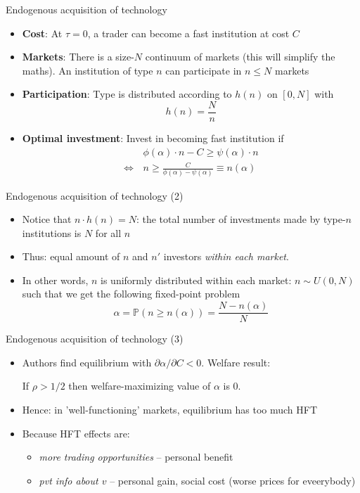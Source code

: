\documentclass[english,10pt
,aspectratio=169
]{beamer}
\begin{document}
\begin{frame}{Endogenous acquisition of technology}
	\begin{itemize}
		\item \textbf{Cost}: At $\tau=0$, a trader can become a fast institution at cost $C$
		\item \textbf{Markets}: There is a size-$N$ continuum of markets (this will simplify the maths). An institution of type $n$ can participate in $n \leq N$ markets
		\item \textbf{Participation}: Type is distributed according to $h(n)$ on $[0, N]$ with
		\[
		h(n) = \frac{N}{n}
		\]
		\item \textbf{Optimal investment}: Invest in becoming fast institution if
		\begin{align*}
		& \phi(\alpha) \cdot n - C \geq \psi(\alpha) \cdot n  \\
		\Leftrightarrow \, & n \geq \frac{C}{\phi(\alpha)-\psi(\alpha)} \equiv n(\alpha)
		\end{align*}
	\end{itemize}
\end{frame}


\begin{frame}{Endogenous acquisition of technology (2)}
	\begin{itemize}
		\item Notice that $n \cdot h(n)=N$: the total number of investments made by type-$n$ institutions is $N$ for all $n$
		\item Thus: equal amount of $n$ and $n'$ investors \textit{within each market}.
		\item In other words, $n$ is uniformly distributed within each market: $n \sim U(0,N)$ such that  we get the following fixed-point problem
		\[
		\alpha = \mathbb{P}(n \ge n(\alpha))=\frac{N-n(\alpha)}{N}
		\]
	\end{itemize}
\end{frame}


\begin{frame}{Endogenous acquisition of technology (3)}
	\begin{itemize}
		\item Authors find equilibrium with $\partial \alpha / \partial C<0$. Welfare result:
		\begin{block}{}
			\begin{center}
				If $\rho>1/2$ then welfare-maximizing value of $\alpha$ is 0.
			\end{center}
		\end{block}
		\item Hence: in 'well-functioning' markets, equilibrium has too much HFT
		\item Because HFT effects are:
		\begin{itemize}
			\item \emph{more trading opportunities} -- personal benefit
			\item \emph{pvt info about $v$} -- personal gain, social cost (worse prices for eveerybody)
		\end{itemize}
	\end{itemize}
\end{frame}
\end{document}
